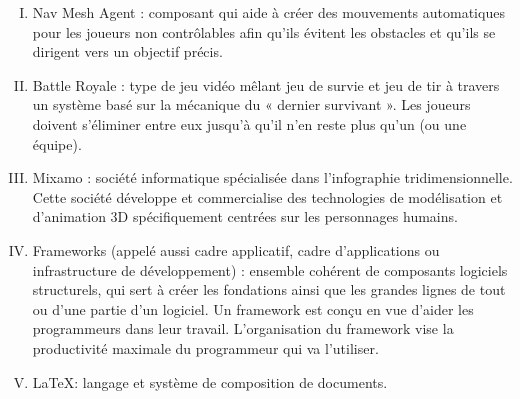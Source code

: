 \documentclass[titlepage, 13px, a4paper]{report}
\begin{document}
{\begin{enumerate}[I.]
	\item Nav Mesh Agent : composant qui aide à créer des mouvements automatiques pour les 
	joueurs non contrôlables afin qu'ils évitent les obstacles et qu'ils se dirigent vers 
	un objectif précis.           \\

	\item Battle Royale : type de jeu vidéo mêlant jeu de survie et jeu de tir à travers 
	un système basé sur la mécanique du « dernier survivant ». Les joueurs doivent s'éliminer 
	entre eux jusqu'à qu'il n'en reste plus qu'un (ou une équipe).       \\

	\item Mixamo : société informatique spécialisée dans l'infographie tridimensionnelle. 
	Cette société développe et commercialise des technologies de modélisation et d'animation 
	3D spécifiquement centrées sur les personnages humains.    \\

	\newpage
	
	\item Frameworks (appelé aussi cadre applicatif, cadre d'applications ou infrastructure 
	de développement) : ensemble cohérent de composants logiciels structurels, qui sert à 
	créer les fondations ainsi que les grandes lignes de tout ou d’une partie d'un logiciel. 
	Un framework est conçu en vue d'aider les programmeurs dans leur travail. L'organisation 
	du framework vise la productivité maximale du programmeur qui va l'utiliser.     \\

	\item \LaTeX : langage et système de composition de documents.   \\
\end{enumerate}}

\end{document}
